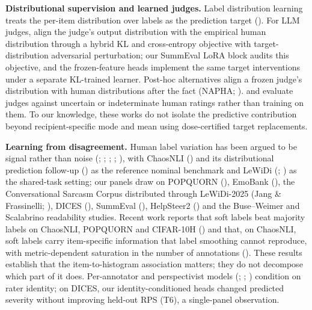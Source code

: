 \documentclass[10pt]{article}
\begin{document}
\textbf{Distributional supervision and learned judges.} Label distribution learning treats the per-item distribution over labels as the prediction target (\citealp{geng2016ldl}). For LLM judges, \citet{chen2025beyond} align the judge's output distribution with the empirical human distribution through a hybrid KL and cross-entropy objective with target-distribution adversarial perturbation; our SummEval LoRA block audits this objective, and the frozen-feature heads implement the same target interventions under a separate KL-trained learner. Post-hoc alternatives align a frozen judge's distribution with human distributions after the fact (NAPHA; \citealp{steindl2026posthoc}). \citet{elangovan2025beyond} and \citet{guerdan2025validating} evaluate judges against uncertain or indeterminate human ratings rather than training on them. To our knowledge, these works do not isolate the predictive contribution beyond recipient-specific mode and mean using dose-certified target replacements.

\textbf{Learning from disagreement.} Human label variation has been argued to be signal rather than noise (\citealp{aroyo2015truth}; \citealp{pavlick2019inherent}; \citealp{uma2021learning}; \citealp{plank2022problem}; \citealp{basile2021we}), with ChaosNLI (\citealp{nie2020chaosnli}) and its distributional prediction follow-up (\citealp{zhou2022distributed}) as the reference nominal benchmark and LeWiDi (\citealp{leonardelli2023lewidi}; \citealp{leonardelli2025lewidi}) as the shared-task setting; our panels draw on POPQUORN (\citealp{pei2023popquorn}), EmoBank (\citealp{buechel2017emobank}), the Conversational Sarcasm Corpus distributed through LeWiDi-2025 (Jang \& Frassinelli; \citealp{leonardelli2025lewidi}), DICES (\citealp{aroyo2023dices}), SummEval (\citealp{fabbri2021summeval}), HelpSteer2 (\citealp{wang2024helpsteer2}) and the Buse--Weimer and Scalabrino readability studies. Recent work reports that soft labels beat majority labels on ChaosNLI, POPQUORN and CIFAR-10H (\citealp{singh2025distributions}) and that, on ChaosNLI, soft labels carry item-specific information that label smoothing cannot reproduce, with metric-dependent saturation in the number of annotations (\citealp{kohli2026metric}). These results establish that the item-to-histogram association matters; they do not decompose which part of it does. Per-annotator and perspectivist models (\citealp{davani2022dealing}; \citealp{gordon2022jury}; \citealp{fleisig2023majority}) condition on rater identity; on DICES, our identity-conditioned heads changed predicted severity without improving held-out RPS (T6), a single-panel observation.
\end{document}
